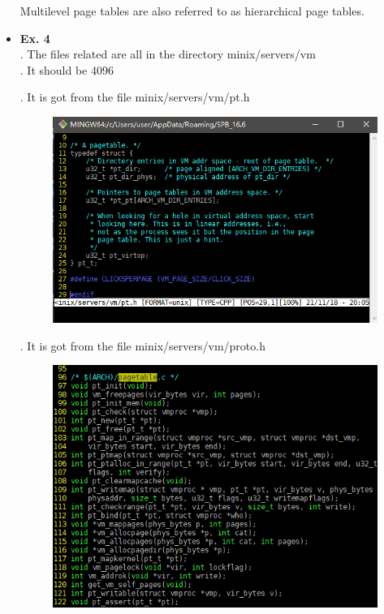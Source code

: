\documentclass{article}
\begin{document}
\begin{itemize}
Multilevel page tables are also referred to as hierarchical page tables.



\item {\bf Ex. 4}\\
{. The files related are all in the directory minix/servers/vm}\\

{. It should be 4096}

{. It is got from the file minix/servers/vm/pt.h}

\newpage

\begin{figure}[h]
    \centering
    \includegraphics[scale=0.5]{1.png}
\end{figure}

{. It is got from the file minix/servers/vm/proto.h}

\begin{figure}[h]
    \centering
    \includegraphics[scale=0.5]{2.png}
\end{figure}


\end{itemize}
\end{document}
